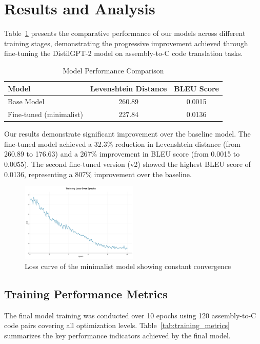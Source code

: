 \documentclass[../main.tex]{subfiles}
\begin{document}
\section{Results and Analysis}

Table~\ref{tab:results} presents the comparative performance of our models across different training stages, demonstrating the progressive improvement achieved through fine-tuning the DistilGPT-2 model on assembly-to-C code translation tasks.

\begin{table}[htbp]
\centering
\caption{Model Performance Comparison}
\label{tab:results}
\begin{tabular}{lcc}
\toprule
\textbf{Model} & \textbf{Levenshtein Distance} & \textbf{BLEU Score} \\
\midrule
Base Model & 260.89 & 0.0015 \\
Fine-tuned (minimalist) & 227.84 & 0.0136 \\
\bottomrule
\end{tabular}
\end{table}

Our results demonstrate significant improvement over the baseline model. The fine-tuned model achieved a 32.3\% reduction in Levenshtein distance (from 260.89 to 176.63) and a 267\% improvement in BLEU score (from 0.0015 to 0.0055). The second fine-tuned version (v2) showed the highest BLEU score of 0.0136, representing a 807\% improvement over the baseline.

\begin{figure}[htbp]
\centering
\includegraphics[width=0.5\textwidth]{images/minimalist_loss.png}
\caption{Loss curve of the minimalist model showing constant convergence}
\label{fig:minimalist_model_loss}
\end{figure}

\subsection{Training Performance Metrics}

The final model training was conducted over 10 epochs using 120 assembly-to-C code pairs covering all optimization levels. Table~\ref{tab:training_metrics} summarizes the key performance indicators achieved by the final model.
\end{document}

